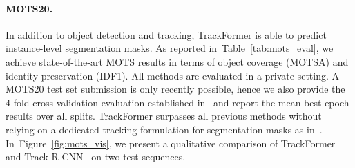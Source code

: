 \documentclass[10pt,twocolumn,letterpaper]{article}
\newcommand{\figref}[1]{Figure~\ref{#1}}
\newcommand{\tabref}[1]{Table~\ref{#1}}
\begin{document}
\paragraph{MOTS20.}
In addition to object detection and tracking, TrackFormer is able to predict instance-level segmentation masks.
As reported in~\tabref{tab:mots_eval}, we achieve state-of-the-art MOTS results in terms of object coverage (MOTSA) and identity preservation (IDF1).
All methods are evaluated in a private setting.
A MOTS20 test set submission is only recently possible, hence we also provide the 4-fold cross-validation evaluation established in~\cite{MOTS} and report the mean best epoch results over all splits.
\mbox{TrackFormer} surpasses all previous methods without relying on a dedicated tracking formulation for segmentation masks as in~\cite{pointtrack}.
In~\figref{fig:mots_vis}, we present a qualitative comparison of TrackFormer and Track R-CNN~\cite{MOTS} on two test sequences.
\end{document}
